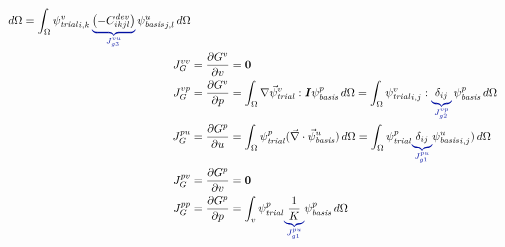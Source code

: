 \begin{align}
\, d\Omega 
  = \int_\Omega \trialscalar[v]_{i,k} \, \eqnannotate{\left(-C^\mathit{dev}_{ikjl}\right)}
{J_{g3}^{vu}}  \, 
\basisscalar[u]_{j,l}\, d\Omega \\
  J_G^{vv} &= \frac{\partial G^v}{\partial v} = \tensor{0} \\
  J_G^{vp} &= \frac{\partial G^v}{\partial p} = \int_\Omega \nabla\trialvec[v] : \tensor{I} 
\basisscalar[p] \, 
d\Omega = \int_\Omega \trialscalar[v]_{i,j} : \eqnannotate{\delta_{ij}}{J_{g2}^{vp}} \, 
\basisscalar[p] \, d\Omega 
\\
%
  J_G^{pu} &= \frac{\partial G^p}{\partial u} = \int_\Omega \trialscalar[p] (\vec{\nabla} 
\cdot \basisvec[u]) \, 
d\Omega = \int_\Omega \trialscalar[p] \eqnannotate{\delta_{ij}}{J_{g1}^{pu}} 
\basisscalar[u]_{i,j}) \, d\Omega\\
  J_G^{pv} &= \frac{\partial G^p}{\partial v} = \tensor{0} \\
  J_G^{pp} &= \frac{\partial G^p}{\partial p} = \int_v \trialscalar[p] \eqnannotate{\frac{1}
{K}}{J_{g1}^{pu}} 
\basisscalar[p] \, d\Omega
\end{align}


